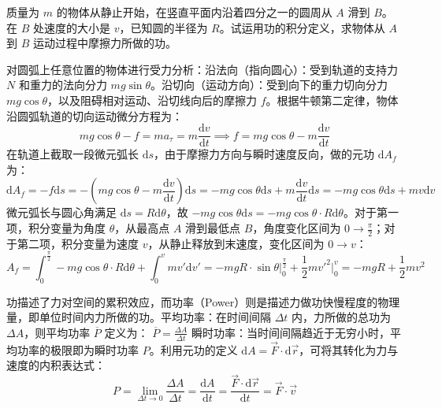 \begin{exercise}
质量为 $m$ 的物体从静止开始，在竖直平面内沿着四分之一的圆周从 $A$ 滑到 $B$。在 $B$ 处速度的大小是 $v$，已知圆的半径为 $R$。试运用功的积分定义，求物体从 $A$ 到 $B$ 运动过程中摩擦力所做的功。
\end{exercise}
\begin{solution}
对圆弧上任意位置的物体进行受力分析：沿法向（指向圆心）：受到轨道的支持力 $N$ 和重力的法向分力 $mg\sin\theta$。沿切向（运动方向）：受到向下的重力切向分力 $mg\cos\theta$，以及阻碍相对运动、沿切线向后的摩擦力 $f$。根据牛顿第二定律，物体沿圆弧轨道的切向运动微分方程为：$$mg\cos\theta - f = ma_\tau = m\frac{\mathrm{d}v}{\mathrm{d}t}\implies f = mg\cos\theta - m\frac{\mathrm{d}v}{\mathrm{d}t}$$
在轨道上截取一段微元弧长 $\mathrm{d}s$，由于摩擦力方向与瞬时速度反向，做的元功 $\mathrm{d}A_f$ 为：
$$\mathrm{d}A_f = -f\mathrm{d}s = -\left(mg\cos\theta - m\frac{\mathrm{d}v}{\mathrm{d}t}\right)\mathrm{d}s= -mg\cos\theta\mathrm{d}s + m\frac{\mathrm{d}v}{\mathrm{d}t}\mathrm{d}s= -mg\cos\theta\mathrm{d}s + mv\mathrm{d}v$$
微元弧长与圆心角满足 $\mathrm{d}s = R\mathrm{d}\theta$，故 $-mg\cos\theta\mathrm{d}s = -mg\cos\theta \cdot R\mathrm{d}\theta$。对于第一项，积分变量为角度 $\theta$，从最高点 $A$ 滑到最低点 $B$，角度变化区间为 $0 \to \frac{\pi}{2}$；对于第二项，积分变量为速度 $v$，从静止释放到末速度，变化区间为 $0 \to v$：
$$A_f = \int_{0}^{\frac{\pi}{2}} -mg\cos\theta \cdot R\mathrm{d}\theta + \int_{0}^{v} mv'\mathrm{d}v'= -mgR \cdot \sin\theta \Big|_0^{\frac{\pi}{2}} + \frac{1}{2}mv'^2 \Big|_0^v= -mgR + \frac{1}{2}mv^2$$
\end{solution}

\begin{definition}[功率]
功描述了力对空间的累积效应，而功率（Power）则是描述力做功快慢程度的物理量，即单位时间内力所做的功。平均功率：在时间间隔 $\Delta t$ 内，力所做的总功为 $\Delta A$，则平均功率 $\overline{P}$ 定义为： \(\overline{P} = \frac{\Delta A}{\Delta t}\) 瞬时功率：当时间间隔趋近于无穷小时，平均功率的极限即为瞬时功率 $P$。利用元功的定义 $\mathrm{d}A = \vec{F} \cdot \mathrm{d}\vec{r}$，可将其转化为力与速度的内积表达式：$$P = \lim_{\Delta t \to 0} \frac{\Delta A}{\Delta t} = \frac{\mathrm{d}A}{\mathrm{d}t} = \frac{\vec{F} \cdot \mathrm{d}\vec{r}}{\mathrm{d}t} = \vec{F} \cdot \vec{v}$$
\end{definition}

